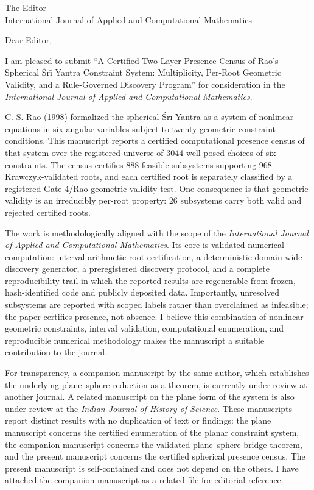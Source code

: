 \documentclass[10pt]{letter}
\begin{document}
\begin{letter}{
The Editor\\
International Journal of Applied and Computational Mathematics
}

\opening{Dear Editor,}

I am pleased to submit ``A Certified Two-Layer Presence Census of Rao's
Spherical \'{S}r\={\i} Yantra Constraint System: Multiplicity, Per-Root
Geometric Validity, and a Rule-Governed Discovery Program'' for consideration
in the \emph{International Journal of Applied and Computational Mathematics}.

C. S. Rao (1998) formalized the spherical \'{S}r\={\i} Yantra as a system of
nonlinear equations in six angular variables subject to twenty geometric
constraint conditions. This manuscript reports a certified computational
presence census of that system over the registered universe of 3044 well-posed
choices of six constraints. The census certifies 888 feasible subsystems
supporting 968 Krawczyk-validated roots, and each certified root is separately
classified by a registered Gate-4/Rao geometric-validity test. One consequence
is that geometric validity is an irreducibly per-root property: 26 subsystems
carry both valid and rejected certified roots.

The work is methodologically aligned with the scope of the
\emph{International Journal of Applied and Computational Mathematics}. Its core
is validated numerical computation: interval-arithmetic root certification, a
deterministic domain-wide discovery generator, a preregistered discovery
protocol, and a complete reproducibility trail in which the reported results
are regenerable from frozen, hash-identified code and publicly deposited data.
Importantly, unresolved subsystems are reported with scoped labels rather than
overclaimed as infeasible; the paper certifies presence, not absence. I believe
this combination of nonlinear geometric constraints, interval validation,
computational enumeration, and reproducible numerical methodology makes the
manuscript a suitable contribution to the journal.

For transparency, a companion manuscript by the same author, which establishes
the underlying plane--sphere reduction as a theorem, is currently under review
at another journal. A related manuscript on the plane form of the system is also
under review at the \emph{Indian Journal of History of Science}. These
manuscripts report distinct results with no duplication of text or findings:
the plane manuscript concerns the certified enumeration of the planar constraint
system, the companion manuscript concerns the validated plane--sphere bridge
theorem, and the present manuscript concerns the certified spherical presence
census. The present manuscript is self-contained and does not depend on the
others. I have attached the companion manuscript as a related file for
editorial reference.


\end{letter}
\end{document}
